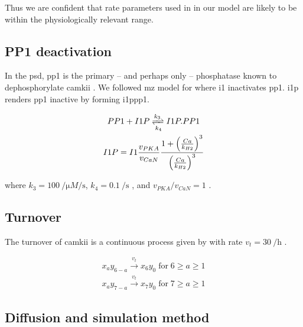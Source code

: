 \documentclass[9pt,lineno,doublespacing]{elife}
\begin{document}
Thus we are confident that rate parameters used in  in our model
are likely to be within the physiologically relevant range.

\subsection{PP1 deactivation}\label{subsec:pp1_deactivation} 

In the \gls{psd}, \gls{pp1} is the primary -- and perhaps only -- phosphatase
known to dephosphorylate \gls{camkii} \citep{strack_translocation_1997}. We
followed \gls{mz} model for  where \gls{i1} inactivates \gls{pp1}. 
\Gls{i1p} renders \gls{pp1} inactive by forming \gls{i1ppp1}. 

\begin{equation}\label{eq:i1pandpp1}
    \begin{gathered}
        PP1 + I1P \xrightleftharpoons[k_4]{k_3} I1P.PP1 \\
        I1P = I1 \frac{v_{PKA}}{v_{CaN}} 
            \frac{1+\left(\frac{Ca}{k_{H2}}\right)^3}{\left(\frac{Ca}{k_{H2}}\right)^3}
    \end{gathered}
\end{equation}

\noindent where $k_3=\SI{100}{\per\micro M\per\second}$,
$k_4=\SI{0.1}{\per\second}$ \citep{endo_multiple_1996}, and $v_{PKA}/v_{CaN}=1$
\citep{miller_stability_2005}.

\subsection{Turnover}\label{turnover}

The turnover of \gls{camkii} is a continuous process given by  with rate
$v_{t}=\SI{30}{\per\hour}$ \citep{ehlers_activity_2003}.

\begin{equation} \label{eq:turnover}
    \begin{gathered}
        x_ay_{6-a} \xrightarrow{v_t} x_6y_0\; \text{for}\; 6\ge a\ge 1 \\
        x_ay_{7-a} \xrightarrow{v_t} x_7y_0\; \text{for}\; 7\ge a\ge 1
    \end{gathered}
\end{equation}

\subsection{Diffusion and simulation method}\label{subsec:simulator}
\end{document}
